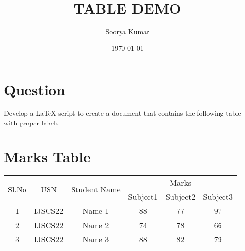 \documentclass[12pt,a4paper]{article}
\title{\LARGE \textbf{TABLE DEMO}}
\author{Soorya Kumar}
\date{\today}
\begin{document}
	\maketitle
	
	\section*{Question}
		{\large Develop a LaTeX script to create a document that contains the following table with proper labels.}\\
	
	\section*{Marks Table}
		\begin{tabular}{|c|c|c|c|c|c|}
			\hline 
			\multirow{2}{*}{Sl.No} & \multirow{2}{*}{USN} & \multirow{2}{*}{Student Name} & \multicolumn{3}{c|}{Marks} \\ 
			\cline{4-6} 
			&  &  & Subject1 & Subject2 & Subject3 \\ 
			\hline 
			1 & IJSCS22 & Name 1 & 88 & 77 & 97 \\ 
			\hline 
			2 & IJSCS22 & Name 2 & 74 & 78 & 66 \\ 
			\hline 
			3 & IJSCS22 & Name 3 & 88 & 82 & 79 \\ 
			\hline 
		\end{tabular} 
	
\end{document}
